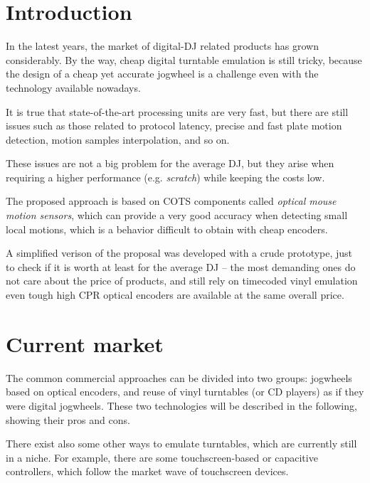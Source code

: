 \documentclass[a4paper,10pt]{article}
\begin{document}
\vspace{4ex}	%
\begin{multicols}{2}


\section{Introduction}
\label{sec:introduction}

In the latest years, the market of digital-DJ related products has grown
considerably. By the way, cheap digital turntable emulation is still tricky,
because the design of a cheap yet accurate jogwheel is a challenge even with
the technology available nowadays.

It is true that state-of-the-art processing units are very fast, but there are
still issues such as those related to protocol latency, precise and fast plate
motion detection, motion samples interpolation, and so on.

These issues are not a big problem for the average DJ, but they arise when
requiring a higher performance (e.g. \emph{scratch}) while keeping the costs
low.

The proposed approach is based on COTS components called \emph{optical mouse
motion sensors}, which can provide a very good accuracy when detecting small
local motions, which is a behavior difficult to obtain with cheap encoders.

A simplified verison of the proposal was developed with a crude prototype,
just to check if it is worth at least for the average DJ -- the most demanding
ones do not care about the price of products, and still rely on timecoded
vinyl emulation even tough high CPR optical encoders are available at the same
overall price.


\section{Current market}
\label{sec:current_market}

The common commercial approaches can be divided into two groups: jogwheels
based on optical encoders, and reuse of vinyl turntables (or CD players) as if
they were digital jogwheels. These two technologies will be described in the
following, showing their pros and cons.

There exist also some other ways to emulate turntables, which are currently
still in a niche. For example, there are some touchscreen-based \cite{sm_emulator}
\cite{hn_touchosc} or capacitive \cite{stanton_scs3d} controllers, which
follow the market wave of touchscreen devices.


\end{multicols}
\end{document}
